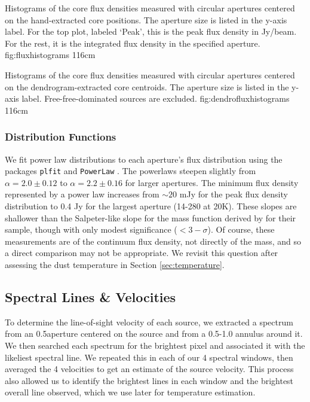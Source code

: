 \documentclass{aa}
\begin{document}
{Histograms of the core flux densities measured with circular apertures centered
on the hand-extracted core positions.  The aperture size is listed 
in the y-axis label.  For the top plot, labeled `Peak', this is the peak
flux density in Jy/beam.  For the rest, it is the integrated flux density
in the specified aperture.}
{fig:fluxhistograms}
{1}{16cm}

{Histograms of the core flux densities measured with circular apertures centered
on the dendrogram-extracted core centroids.  The aperture size is listed 
in the y-axis label.  Free-free-dominated sources are excluded.}
{fig:dendrofluxhistograms}
{1}{16cm}

\subsubsection{Distribution Functions}
We fit power law distributions to each aperture's flux distribution using the
packages \texttt{plfit} and \texttt{PowerLaw}
\citep[https://github.com/keflavich/plfit,
https://github.com/jeffalstott/powerlaw;][]{Clauset2007a,Alstott2014a}.  The
powerlaws steepen slightly from $\alpha=2.0\pm0.12$ to $\alpha=2.2\pm0.16$ for
larger apertures.  The minimum flux density represented by a power law
increases from $\sim20$ mJy for the peak flux density distribution to 0.4 Jy
for the largest aperture (14-280 \msun at 20K).  These slopes are shallower
than the Salpeter-like slope for the mass function derived by
\citep{Konyves2015a} for their sample, though with only modest significance
($<3-\sigma$).  Of course, these measurements are of the continuum flux
density, not directly of the mass, and so a direct comparison may not be
appropriate.  We revisit this question after assessing the dust temperature in
Section \ref{sec:temperature}.

\subsection{Spectral Lines \& Velocities}
To determine the line-of-sight velocity of each source, we extracted a spectrum
from an 0.5\arcsec aperture centered on the source and from a 0.5-1.0\arcsec
annulus around it.  We then searched each spectrum for the brightest pixel and
associated it with the likeliest spectral line.  We repeated this in each of
our 4 spectral windows, then averaged the 4 velocities to get an estimate of
the source velocity.   This process also allowed us to identify the brightest
lines in each window and the brightest overall line observed, which we use
later for temperature estimation.
\end{document}
